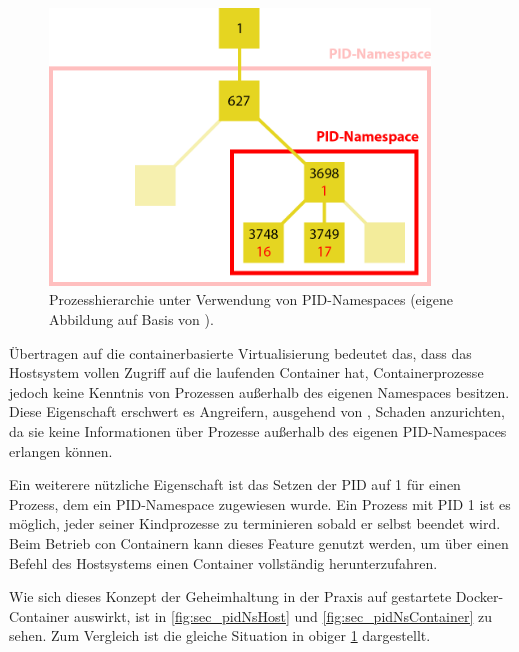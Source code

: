 \documentclass[../main.tex]{subfiles}
\begin{document}
			\vspace{0.5cm}
			\begin{figure}[h]
					\centering
					\includegraphics[width=0.9\textwidth]{./images/sec_pidNs.png}
					\caption{Prozesshierarchie unter Verwendung von PID-Namespaces (eigene Abbildung auf Basis von \cite{nsFigures}).}
					\label{fig:sec_pidNs}
			\end{figure}

			Übertragen auf die containerbasierte Virtualisierung bedeutet das, dass das Hostsystem vollen Zugriff auf die laufenden Container hat, Containerprozesse jedoch keine Kenntnis von Prozessen außerhalb des eigenen Namespaces besitzen. Diese Eigenschaft erschwert es Angreifern, ausgehend von \cbroken{}, Schaden anzurichten, da sie keine Informationen über Prozesse außerhalb des eigenen PID-Namespaces erlangen können.

			Ein weiterere nützliche Eigenschaft ist das Setzen der PID auf 1 für einen Prozess, dem ein PID-Namespace zugewiesen wurde. Ein Prozess mit PID 1 ist es möglich, jeder seiner Kindprozesse zu terminieren sobald er selbst beendet wird. Beim Betrieb con Containern kann dieses Feature genutzt werden, um über einen Befehl des Hostsystems einen Container vollständig herunterzufahren.



			Wie sich dieses Konzept der Geheimhaltung in der Praxis auf gestartete Docker-Container auswirkt, ist in \fig \ref{fig:sec_pidNsHost} und \fig \ref{fig:sec_pidNsContainer} zu sehen. Zum Vergleich ist die gleiche Situation in obiger \fig \ref{fig:sec_pidNs} dargestellt.
\end{document}
